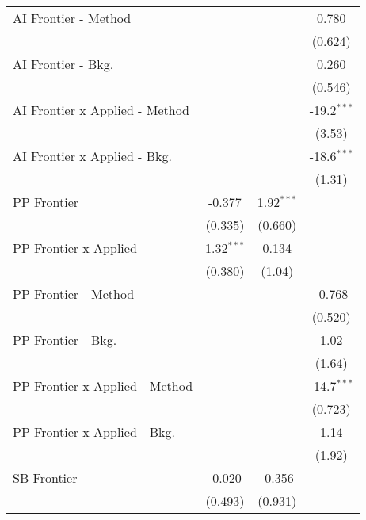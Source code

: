 \begin{tabular}{lccc}
   AI Frontier - Method           &              &               & 0.780\\   
                                  &              &               & (0.624)\\   
   AI Frontier - Bkg.             &              &               & 0.260\\   
                                  &              &               & (0.546)\\   
   AI Frontier x Applied - Method &              &               & -19.2$^{***}$\\   
                                  &              &               & (3.53)\\   
   AI Frontier x Applied - Bkg.   &              &               & -18.6$^{***}$\\   
                                  &              &               & (1.31)\\   
   PP Frontier                    & -0.377       & 1.92$^{***}$  &   \\   
                                  & (0.335)      & (0.660)       &   \\   
   PP Frontier x Applied          & 1.32$^{***}$ & 0.134         &   \\   
                                  & (0.380)      & (1.04)        &   \\   
   PP Frontier - Method           &              &               & -0.768\\   
                                  &              &               & (0.520)\\   
   PP Frontier - Bkg.             &              &               & 1.02\\   
                                  &              &               & (1.64)\\   
   PP Frontier x Applied - Method &              &               & -14.7$^{***}$\\   
                                  &              &               & (0.723)\\   
   PP Frontier x Applied - Bkg.   &              &               & 1.14\\   
                                  &              &               & (1.92)\\   
   SB Frontier                    & -0.020       & -0.356        &   \\   
                                  & (0.493)      & (0.931)       &   \\   

\end{tabular}

